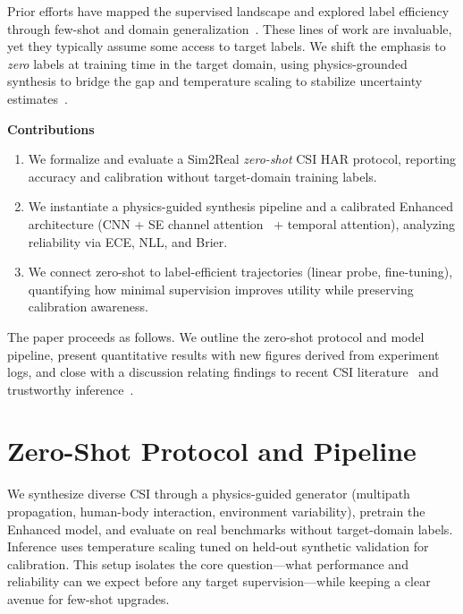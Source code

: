 \documentclass[journal]{IEEEtran}
\begin{document}
Prior efforts have mapped the supervised landscape and explored label efficiency through few-shot and domain generalization~\cite{fewsense2022,airfi2022}. These lines of work are invaluable, yet they typically assume some access to target labels. We shift the emphasis to \emph{zero} labels at training time in the target domain, using physics-grounded synthesis to bridge the gap and temperature scaling to stabilize uncertainty estimates~\cite{calibration_guo2017}.

\textbf{Contributions}
\begin{enumerate}
  \item We formalize and evaluate a Sim2Real \emph{zero-shot} CSI HAR protocol, reporting accuracy and calibration without target-domain training labels.
  \item We instantiate a physics-guided synthesis pipeline and a calibrated Enhanced architecture (CNN + SE channel attention~\cite{se_networks2018} + temporal attention), analyzing reliability via ECE, NLL, and Brier.
  \item We connect zero-shot to label-efficient trajectories (linear probe, fine-tuning), quantifying how minimal supervision improves utility while preserving calibration awareness.
\end{enumerate}

\noindent The paper proceeds as follows. We outline the zero-shot protocol and model pipeline, present quantitative results with new figures derived from experiment logs, and close with a discussion relating findings to recent CSI literature~\cite{yang2023sensefi,fewsense2022,airfi2022} and trustworthy inference~\cite{calibration_guo2017}.

\section{Zero-Shot Protocol and Pipeline}
We synthesize diverse CSI through a physics-guided generator (multipath propagation, human-body interaction, environment variability), pretrain the Enhanced model, and evaluate on real benchmarks without target-domain labels. Inference uses temperature scaling tuned on held-out synthetic validation for calibration. This setup isolates the core question—what performance and reliability can we expect before any target supervision—while keeping a clear avenue for few-shot upgrades.
\end{document}

